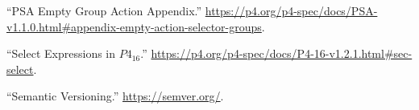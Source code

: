 \documentclass[11pt]{article}
\begin{document}
{{\begin{thebibliography}{44}
\mdbibitemlabel{{}[29]}\textquotedblleft{}PSA Empty Group Action Appendix.\textquotedblright{} \href{https://p4.org/p4-spec/docs/PSA-v1.1.0.html\%23appendix-empty-action-selector-groups}{{\ttfamily https://\hspace{0pt}p4.\hspace{0pt}org/\hspace{0pt}p4-\hspace{0pt}spec/\hspace{0pt}docs/\hspace{0pt}PSA-\hspace{0pt}v1.\hspace{0pt}1.\hspace{0pt}0.\hspace{0pt}html\#\hspace{0pt}appendix-\hspace{0pt}empty-\hspace{0pt}action-\hspace{0pt}selector-\hspace{0pt}groups}}.\label{psaemptygroupactionappendix}%

\mdbibitemlabel{{}[30]}\textquotedblleft{}Select Expressions in $P4_{16}$.\textquotedblright{} \href{https://p4.org/p4-spec/docs/P4-16-v1.2.1.html\%23sec-select}{{\ttfamily https://\hspace{0pt}p4.\hspace{0pt}org/\hspace{0pt}p4-\hspace{0pt}spec/\hspace{0pt}docs/\hspace{0pt}P4-\hspace{0pt}16-\hspace{0pt}v1.\hspace{0pt}2.\hspace{0pt}1.\hspace{0pt}html\#\hspace{0pt}sec-\hspace{0pt}select}}.\label{p4selectexpr}%

\mdbibitemlabel{{}[31]}\textquotedblleft{}Semantic Versioning.\textquotedblright{} \href{https://semver.org/}{{\ttfamily https://\hspace{0pt}semver.\hspace{0pt}org/\hspace{0pt}}}.\label{semver}%


\end{thebibliography}}}
\end{document}
